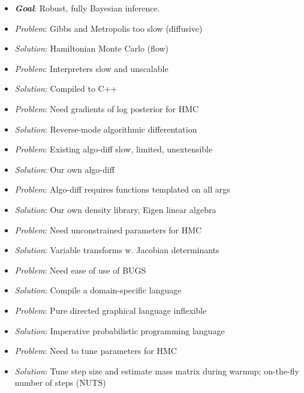\documentclass[10pt]{report}
\begin{document}
%
\begin{itemize}
\item {\slshape\bfseries Goal}: Robust, fully Bayesian inference.
\end{itemize}
%
\vspace*{2pt}
\begin{itemize}
\item {\slshape Problem}: Gibbs and Metropolis too slow (diffusive) 
\item {\slshape Solution}: Hamiltonian Monte Carlo (flow)
%
\vspace*{8pt}
\item {\slshape Problem}:  Interpreters slow and unscalable
\item {\slshape Solution}: Compiled to C++
%
\vspace*{8pt}
\item {\slshape Problem}:  Need gradients of log posterior for HMC
\item {\slshape Solution}: Reverse-mode algorithmic differentation
\end{itemize}


%
\begin{itemize}
\item {\slshape Problem}:  Existing algo-diff slow, limited, unextensible
\item {\slshape Solution}: Our own algo-diff
%
\vspace*{8pt}
\item {\slshape Problem}:  Algo-diff requires functions templated on
  all args
\item {\slshape Solution}: Our own density library, Eigen linear
 algebra
%
\vspace*{8pt}
\item {\slshape Problem}:  Need unconstrained parameters for HMC
\item {\slshape Solution}: Variable transforms w. Jacobian determinants
%
\end{itemize}


%
\begin{itemize}
\item {\slshape Problem}:  Need ease of use of BUGS
\item {\slshape Solution}: Compile a domain-specific language
%
\vspace*{8pt}
\item {\slshape Problem}:  Pure directed graphical language inflexible
\item {\slshape Solution}: Imperative probabilistic programming
  language
\vspace*{8pt}
\item {\slshape Problem}:  Need to tune parameters for HMC
\item {\slshape Solution}: Tune step size and estimate mass matrix
  during warmup;  on-the-fly number of steps (NUTS)
%
\end{itemize}
\end{document}
